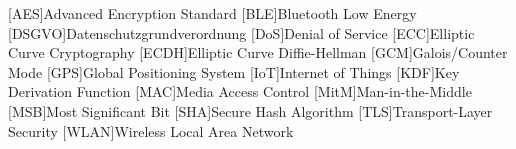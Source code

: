 \begin{acronym}[AAAAA]

    [AES]{Advanced Encryption Standard}
    [BLE]{Bluetooth Low Energy}
    [DSGVO]{Datenschutzgrundverordnung}
    [DoS]{Denial of Service}
    [ECC]{Elliptic Curve Cryptography}
    [ECDH]{Elliptic Curve Diffie-Hellman}
    [GCM]{Galois/Counter Mode}
    [GPS]{Global Positioning System}
    [IoT]{Internet of Things}
    [KDF]{Key Derivation Function}
    [MAC]{Media Access Control}
    [MitM]{Man-in-the-Middle}
    [MSB]{Most Significant Bit}
    [SHA]{Secure Hash Algorithm}
    [TLS]{Transport-Layer Security}
    [WLAN]{Wireless Local Area Network}
    
\end{acronym}